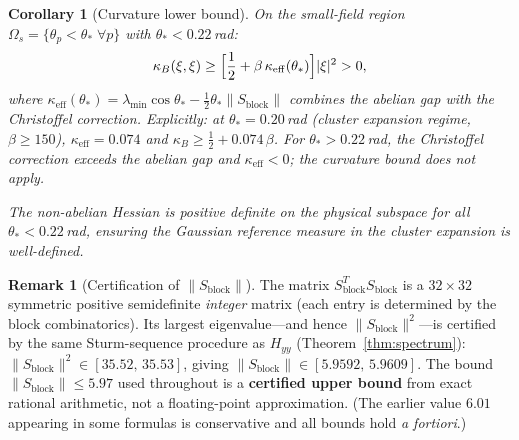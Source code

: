 \documentclass[11pt]{article}
\newtheorem{corollary}[theorem]{Corollary}
\theoremstyle{definition}
\newtheorem{remark}[theorem]{Remark}
\begin{document}
\begin{corollary}[Curvature lower bound]\label{cor:curvature}
On the small-field region $\Omega_s=\{\theta_p<\theta_*\;\forall p\}$
with $\theta_*<0.22$\,rad:
\begin{equation}\label{eq:kappa}
\kappa_B(\xi,\xi)
\ge\Bigl[\frac{1}{2}+\beta\,\kappa_{\mathrm{eff}}(\theta_*)\Bigr]|\xi|^2
>0,
\end{equation}
where $\kappa_{\mathrm{eff}}(\theta_*)
=\lambda_{\min}\cos\theta_*-\tfrac{1}{2}\theta_*\|S_{\mathrm{block}}\|$
combines the abelian gap with the Christoffel correction.
Explicitly: at $\theta_*=0.20$\,rad (cluster expansion regime,
$\beta\ge 150$), $\kappa_{\mathrm{eff}}=0.074$
and $\kappa_B\ge\frac{1}{2}+0.074\,\beta$.
For $\theta_*>0.22$\,rad, the Christoffel correction exceeds the
abelian gap and $\kappa_{\mathrm{eff}}<0$; the curvature bound does
not apply.

The non-abelian Hessian is positive definite on the physical
subspace for all $\theta_*<0.22$\,rad, ensuring the Gaussian
reference measure in the cluster expansion is well-defined.
\end{corollary}

\begin{remark}[Certification of $\|S_{\mathrm{block}}\|$]%
\label{rem:sblock-cert}
The matrix $S_{\mathrm{block}}^TS_{\mathrm{block}}$ is a
$32\times 32$ symmetric positive semidefinite \emph{integer}
matrix (each entry is determined by the block combinatorics).
Its largest eigenvalue---and hence $\|S_{\mathrm{block}}\|^2$---is
certified by the same Sturm-sequence procedure as $H_{yy}$
(Theorem~\ref{thm:spectrum}):
$\|S_{\mathrm{block}}\|^2\in[35.52,\,35.53]$,
giving $\|S_{\mathrm{block}}\|\in[5.9592,\,5.9609]$.
The bound $\|S_{\mathrm{block}}\|\le 5.97$ used throughout
is a \textbf{certified upper bound} from exact rational
arithmetic, not a floating-point approximation.
(The earlier value $6.01$ appearing in some formulas
is conservative and all bounds hold \emph{a fortiori}.)
\end{remark}
\end{document}
